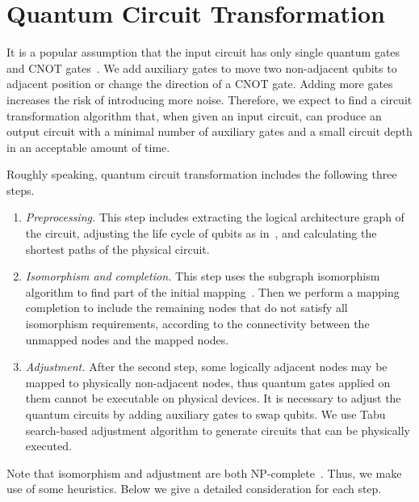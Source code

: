 \documentclass[journal]{IEEEtran}
\newcommand{\leaveout}[1]{}
\begin{document}
	
	\section{Quantum Circuit Transformation}
	\label{Problem Description and Solution Outline}
	It is a popular assumption that the input circuit has only  single quantum gates and CNOT gates~\cite{1995Barenco,2005Mttnen}. We add auxiliary gates %
	to move two non-adjacent qubits to adjacent position or change the direction of a CNOT gate. Adding more gates increases the risk of introducing more noise. Therefore,
	we expect to find a circuit transformation algorithm that, when given an input circuit, can produce an output circuit with a minimal number of auxiliary gates and a small circuit depth in an acceptable amount of time.
	
	Roughly speaking, quantum circuit transformation includes the following three steps.
	
	\leaveout{ %
		\begin{figure}[htbp] 
			\centering
			\texttt{[image: uml.jpg]}		 
			\caption{Circuit transformation process}
			\label{processing}	
		\end{figure}
	} %
	
	\begin{enumerate}
		\item \emph{Preprocessing.} 
		This step includes extracting the logical architecture graph of the circuit, adjusting the life cycle of qubits as in~\cite{2019Zhang},  and calculating the shortest paths of the physical circuit.
		\item \emph{Isomorphism and completion.} %
		This step uses the subgraph isomorphism algorithm to find part of the initial mapping~\cite{Sun2020}.
		Then we perform a mapping completion to include the remaining nodes that do not satisfy all isomorphism requirements, according to the connectivity between the unmapped nodes and the mapped nodes.
		\item \emph{Adjustment.} %
		After the second step, some logically adjacent nodes may be mapped to physically non-adjacent nodes, thus quantum gates applied on them cannot be executable on physical devices. It is necessary to adjust the quantum circuits by adding auxiliary gates to swap qubits. We use Tabu search-based adjustment algorithm to generate circuits that can be physically executed.
	\end{enumerate}
	Note that isomorphism and adjustment are both NP-complete~\cite{2018QubitSiraichi}. Thus, we make use of some heuristics. Below we give a detailed consideration for each step.
	
\end{document}
